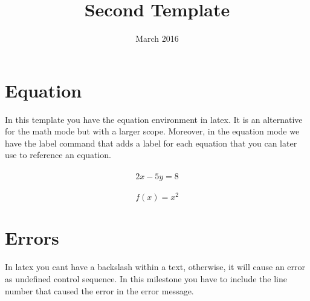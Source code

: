 \documentclass{article}
\begin{document}
\title{Second Template}
\date{March 2016}
\maketitle


\section{Equation}
In this template you have the equation environment in latex. It is an alternative for the math mode but with a larger scope. Moreover, in the equation mode we have the label command that adds a label for each equation that you can later use to reference an equation. \\
\\
\begin{equation}
\label{eq1}
2x-5y=8
\end{equation}
\\
\begin{equation}
\label{eq2}
f(x)=x^2
\end{equation}



\section{Errors}
In latex you cant have a backslash within a text, otherwise, it will cause an error as undefined control sequence. In this milestone you have to include the line number that caused the error in the error message. \errorcoming
\end{document}
